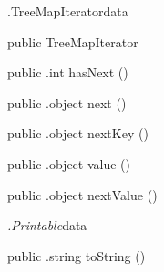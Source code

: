 \begin{CrexxClass}{.TreeMapIterator}{data}

  \begin{Hierarchy}
  \end{Hierarchy}

  \begin{Members}

    \Factory
      {public}
      {TreeMapIterator}
      {}

    \Method
      {public}
      {.int}
      {hasNext}
      {()}

    \Method
      {public}
      {.object}
      {next}
      {()}

    \Method
      {public}
      {.object}
      {nextKey}
      {()}

    \Method
      {public}
      {.object}
      {value}
      {()}

    \Method
      {public}
      {.object}
      {nextValue}
      {()}

  \end{Members}
\end{CrexxClass}

\begin{CrexxClass}{\textit{.Printable}}{data}

  \begin{Hierarchy}
  \end{Hierarchy}

  \begin{Members}

    \Method
      {public}
      {.string}
      {toString}
      {()}

  \end{Members}
\end{CrexxClass}

